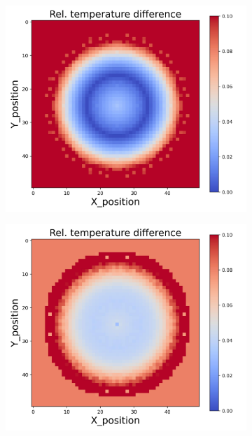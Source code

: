 {\begin{figure}[h]
\begin{minipage}{\textwidth}
\begin{subfigure}{0.27\textwidth}
        \end{subfigure}
        \begin{subfigure}{0.27\textwidth}
            \centering
            \includegraphics[width=\textwidth]{figures/raw_data/23/mix/T_bias.jpg}
        \end{subfigure}
        \begin{subfigure}{0.27\textwidth}
            \centering
            \includegraphics[width=\textwidth]{figures/raw_data/24/mix/T_bias.jpg}

\end{subfigure}
\end{minipage}
\end{figure}}
